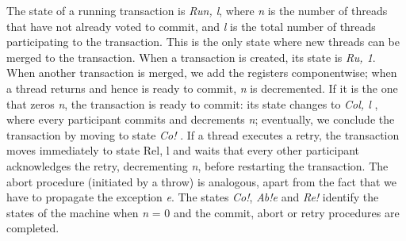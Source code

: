 The state of a running transaction is \emph{Ru\textlangle n, l\textrangle}, where \emph{n} is the number of threads that have not already voted to commit, and \emph{l} is the total number of threads participating to the transaction.
This is the only state where new threads can be merged to the transaction. When a transaction is created, its state is \emph{Ru, 1\textrangle}.
When another transaction is merged, we add the registers componentwise; when a thread returns and hence is ready to commit, \emph{n} is decremented.
If it is the one that zeros \emph{n}, the transaction is ready to commit: its state changes to \emph{Co\textlangle l, l\textrangle} , where every participant commits and decrements \emph{n}; eventually, we conclude the transaction by moving to state \emph{Co!\textlangle \textrangle} .
If a thread executes a retry, the transaction moves immediately to state Re\textlangle l, l\textrangle\xspace and waits that every other participant acknowledges the retry, decrementing \emph{n}, before restarting the transaction.
The abort procedure (initiated by a throw) is analogous, apart from the fact that we have to propagate the exception \emph{e}.
The states \emph{Co!\textlangle \textrangle }, \emph{Ab!\textlangle e\textrangle}  and \emph{Re!\textlangle \textrangle}  identify the states of the machine when \emph{n} = 0 and the commit, abort or retry procedures are completed.

